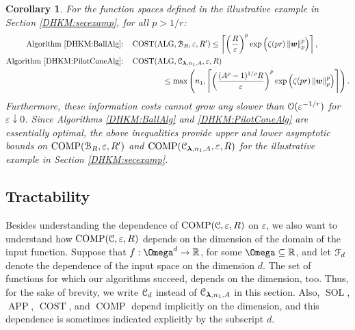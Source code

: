 \documentclass[USenglish]{article}
\theoremstyle{dgthm}
\theoremstyle{dgthm}
\theoremstyle{dgthm}
\newtheorem{corollary}[theorem]{Corollary}
\theoremstyle{dgthm}
\theoremstyle{dgdef}
\theoremstyle{definition}
\DeclareMathOperator{\DHKMSOL}{SOL}
\DeclareMathOperator{\DHKMAPP}{APP}
\DeclareMathOperator{\DHKMALG}{ALG}
\DeclareMathOperator{\DHKMCOST}{COST}
\DeclareMathOperator{\COMP}{COMP}
\newcommand{\norm}[2][{}]{\ensuremath{\left \lVert #2 \right \rVert}_{#1}}
\begin{document}
\begin{corollary}\label{DHKM:cor:illex} 
For the function spaces defined in the illustrative example in Section \ref{DHKM:secexamp}, for all $p > 1/r$:
\begin{align*}
    \text{Algorithm \ref{DHKM:BallAlg}:} \quad& \DHKMCOST(\DHKMALG,\calB_R,\varepsilon, R') 
    \le \left \lceil  \left(\frac{R}{\varepsilon}\right)^p  \exp\left( \zeta(pr) \norm[p]{\bsw}^p  \right)    \right \rceil, \\
    \text{Algorithm \ref{DHKM:PilotConeAlg}:} \quad& \DHKMCOST(\DHKMALG,\calC_{\bslambda,n_1,A},\varepsilon, R) 
    \\ & \qquad \qquad \le \max \left( n_1, 
    \left \lceil  \left(\frac{(A^\rho-1)^{1/\rho}R}{\varepsilon}\right)^p  \exp\left( \zeta(pr) \norm[p]{\bsw}^p  \right)    \right \rceil \right).
    \end{align*}
Furthermore, these information costs cannot grow any slower than ${\mathcal{O}}(\varepsilon^{-1/r})$ for $\varepsilon \downarrow 0$. Since Algorithms \ref{DHKM:BallAlg} and \ref{DHKM:PilotConeAlg} are essentially optimal, the above inequalities provide upper and lower asymptotic bounds on  $\COMP(\calB_R,\varepsilon,R')$ and $\COMP(\calC_{\bslambda,n_1,A},\varepsilon,R)$ for the illustrative example in Section \ref{DHKM:secexamp}.
\end{corollary}




\subsection{Tractability}\label{DHKM:SecPilotTract}


Besides understanding the dependence of $\COMP(\calC, \varepsilon,R)$ on $\varepsilon$, we also want to understand how $\COMP(\calC, \varepsilon,R)$ depends on the dimension of the domain of the input function.  Suppose that $f: \Omega^d \to \R$, for some $\Omega \subseteq \R$, and let ${\mathcal{F}}_d$ denote the dependence of the input space on the dimension $d$.  
The set of functions for which our algorithms succeed, depends on the dimension, too. Thus, for the sake of brevity, we write ${\mathcal{C}}_d$ instead of ${\mathcal{C}}_{{\boldsymbol{\lambda}},n_1,A}$ in this section. Also, $\DHKMSOL$, $\DHKMAPP$, $\DHKMCOST$, and $\COMP$ depend implicitly on the dimension, and this dependence is sometimes indicated explicitly by the subscript $d$.

\bigskip
\end{document}
